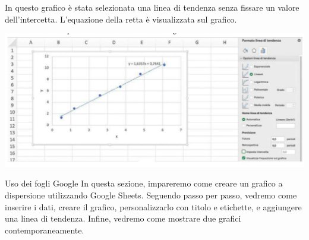 \documentclass[12pt,a4paper,oneside]{book}
\makeatletter
\newcounter{testexample} %
\renewcommand{\section}{\@startsection{section}{1}{\z@}
{-4ex \@plus -1ex \@minus -.4ex}
{1ex \@plus.2ex }
{\normalfont\large\sffamily\bfseries}}
\theoremstyle{esercizio}
\makeatother
\begin{document}
\begin{testexample}

    In questo grafico è stata selezionata una linea di tendenza senza fissare un valore
    dell'intercetta. L'equazione della retta è visualizzata sul grafico.
    
     \begin{minipage}{\linewidth}
        \centering
        \includegraphics[scale=0.2]{path_to_image/linea-tendenza-libre.png} 
        \label{fig:libretendenza}\end{minipage}
    \end{testexample}


\section{Uso dei fogli Google}
In questa sezione, impareremo come creare un grafico a dispersione utilizzando Google Sheets. Seguendo passo per passo, vedremo come inserire i dati, creare il grafico, personalizzarlo con titolo e etichette, e aggiungere una linea di tendenza. Infine, vedremo come mostrare due grafici contemporaneamente.
\end{document}
